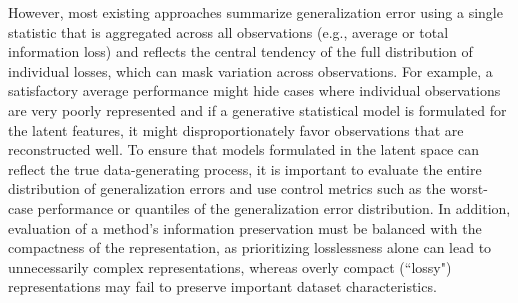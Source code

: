 However, most existing approaches summarize generalization error using a single statistic that is aggregated across all observations (e.g., average or total information loss) and reflects the central tendency of the full distribution of individual losses, which can mask variation across observations.
For example, a satisfactory average performance might hide cases where individual observations are very poorly represented and if a generative statistical model is formulated for the latent features, it might disproportionately favor observations that are reconstructed well.
To ensure that models formulated in the latent space can reflect the true data-generating process, it is important to evaluate the entire distribution of generalization errors and use control metrics such as the worst-case performance or quantiles of the generalization error distribution.
In addition, evaluation of a method's information preservation must be balanced with the compactness of the representation, as prioritizing losslessness alone can lead to unnecessarily complex representations, whereas overly compact (``lossy") representations may fail to preserve important dataset characteristics.

